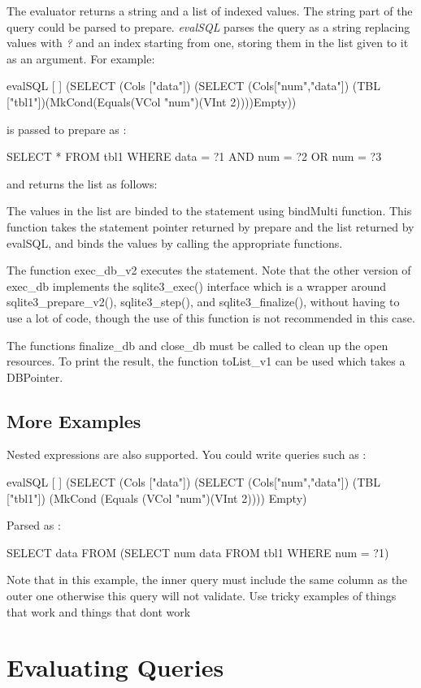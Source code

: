 \documentclass[11pt]{article}
\begin{document}
The evaluator returns a string and a list of indexed values.
The string part of the query could be parsed to prepare. 
\emph{evalSQL} parses the query as a string replacing values with \emph{?} and an index starting from one,
storing them in the list given to it as an argument.
For example:


evalSQL [ ] (SELECT (Cols ["data"]) (SELECT (Cols["num","data"]) (TBL ["tbl1"])(MkCond(Equals(VCol "num")(VInt 2))))Empty))

is passed to prepare as :

SELECT * FROM tbl1 WHERE data = ?1 AND num = ?2 OR num = ?3

and returns the list as follows:

The values in the list are binded to the statement using bindMulti function.
This function takes the statement pointer returned by prepare and the list returned by evalSQL, 
and binds the values by calling the appropriate functions.

The function exec\_db\_v2 executes the statement.
Note that the other version of exec\_db implements the sqlite3\_exec() interface which is a wrapper
around sqlite3\_prepare\_v2(), sqlite3\_step(), and sqlite3\_finalize(),
without having to use a lot of code, though the use of this function is not recommended in this case.

The functions finalize\_db and close\_db must be called to clean up the open resources.
To print the result, the function toList\_v1 can be used which takes a DBPointer.

\subsection{More Examples}
\label{More Examples}
Nested expressions are also supported. You could write queries such as :

evalSQL [ ] (SELECT (Cols ["data"]) (SELECT (Cols["num","data"]) (TBL ["tbl1"]) (MkCond (Equals (VCol "num")(VInt 2)))) Empty)

Parsed as :

SELECT data FROM (SELECT num data FROM tbl1 WHERE num = ?1)

Note that in this example, the inner query must include the same column as the outer one otherwise this query will not validate.
Use tricky examples of things that work and things that dont work

\section{Evaluating Queries}
\label{Evaluating Queries}
\end{document}
